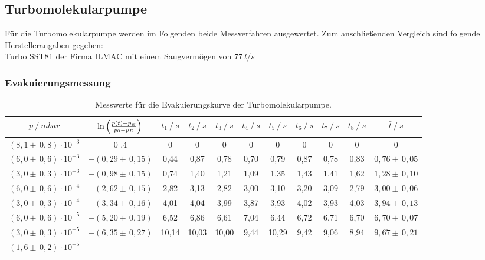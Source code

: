 \subsection{Turbomolekularpumpe}
Für die Turbomolekularpumpe werden im Folgenden beide Messverfahren ausgewertet.
Zum anschließenden Vergleich sind folgende Herstellerangaben\cite{anleitung} gegeben:\\
Turbo SST81 der Firma ILMAC mit einem Saugvermögen von $\SI{77}{l/s}$
\subsubsection{Evakuierungsmessung}
\begin{table}[H]
\tiny
\centering
\begin{tabular}{c|c|c|c|c|c|c|c|c|c|c}
{$p \:/\: \si{mbar}$} & {$\ln{\Bigl( \frac{p(t)-p_E}{p_0-p_E}\Bigr)}$} & {$t_1 \:/\: \si{s} $} & {$t_2 \:/\: \si{s}$} & {$t_3 \:/\: \si{s}$} & {$t_4 \:/\: \si{s}$} & {$t_5 \:/\: \si{s}$} & {$t_6 \:/\: \si{s}$}& {$t_7 \:/\: \si{s}$} & {$t_8 \:/\: \si{s}$} & {$\bar{t} \:/\: \si{s}$}\\
\midrule
$(8,1 \pm \, 0,8)\cdot 10^{-3}$ & 0 \pm 0,4 & 0 &  0 & 0 & 0 & 0 & 0 & 0 & 0 & 0\\
$(6,0 \pm \, 0,6)\cdot 10^{-3}$ & $-(0,29 \pm \, 0,15)$ & 0,44 & 0,87 & 0,78 & 0,70 & 0,79 & 0,87 & 0,78 & 0,83 & $0,76 \pm \, 0,05$\\
$(3,0 \pm \, 0,3)\cdot 10^{-3}$ & $-(0,98 \pm \, 0,15)$ & 0,74 & 1,40 & 1,21 & 1,09 & 1,35 & 1,43 & 1,41 & 1,62 & $1,28 \pm \, 0,10$\\
$(6,0 \pm \, 0,6)\cdot 10^{-4}$ & $-(2,62 \pm \, 0,15)$ & 2,82 & 3,13 & 2,82 & 3,00 & 3,10 & 3,20 & 3,09 & 2,79 & $3,00 \pm \, 0,06$\\
$(3,0 \pm \, 0,3)\cdot 10^{-4}$ & $-(3,34 \pm \, 0,16)$ & 4,01 & 4,04 & 3,99 & 3,87 & 3,93 & 4,02 & 3,93 & 4,03 & $3,94 \pm \, 0,13$\\
$(6,0 \pm \, 0,6)\cdot 10^{-5}$ & $-(5,20 \pm \, 0,19)$ & 6,52 & 6,86 & 6,61 & 7,04 & 6,44 & 6,72 & 6,71 & 6,70 & $6,70 \pm \, 0,07$\\
$(3,0 \pm \, 0,3)\cdot 10^{-5}$ & $-(6,35 \pm \, 0,27)$ & 10,14 & 10,03 & 10,00 & 9,44 & 10,29 & 9,42 & 9,06 & 8,94 & $9,67 \pm \, 0,21$\\
$(1,6 \pm \, 0,2)\cdot 10^{-5}$ & - & - &  -& -& -& -& -& -& -& - \\
\end{tabular}
\caption{Messwerte für die Evakuierungskurve der Turbomolekularpumpe.}
\label{tab:EvakuierungskurveTurbo}
\end{table}

